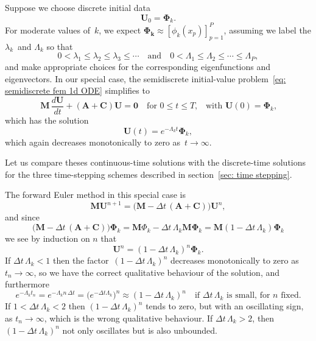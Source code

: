 Suppose we choose discrete initial data
\[
\boldsymbol{U}_0=\boldsymbol{\Phi}_k.
\]
For moderate values of~$k$, we expect 
$\boldsymbol{\Phi_k}\approx[\phi_k(x_p)]_{p=1}^P$, assuming we label the 
$\lambda_k$~and $\Lambda_k$ so that
\[
0<\lambda_1\le\lambda_2\le\lambda_3\le\cdots
\quad\text{and}\quad
0<\Lambda_1\le\Lambda_2\le\cdots\le\Lambda_P,
\]
and make appropriate choices for the corresponding eigenfunctions and 
eigenvectors. In our special case, the semidiscrete initial-value 
problem~\eqref{eq: semidiscrete fem 1d ODE} simplifies to
\[
\boldsymbol{M}\,\frac{d\boldsymbol{U}}{dt}
+(\boldsymbol{A}+\boldsymbol{C})\boldsymbol{U}=\boldsymbol{0}
    \quad\text{for $0\le t\le T$,}
    \quad\text{with $\boldsymbol{U}(0)=\boldsymbol{\Phi}_k$,}
\]
which has the solution
\begin{equation}
\boldsymbol{U}(t)=e^{-\Lambda_kt}\boldsymbol{\Phi}_k,
\end{equation}
which again decreases monotonically to zero as~$t\to\infty$.

Let us compare theses continuous-time solutions with the discrete-time 
solutions for the three time-stepping schemes described in 
section~\ref{sec: time stepping}.  

\begin{example}
The forward Euler method in this special case is
\[
\boldsymbol{M}\boldsymbol{U}^{n+1}=\bigl(\boldsymbol{M}
-\Delta t\,(\boldsymbol{A}+\boldsymbol{C})\bigr)\boldsymbol{U}^n,
\]
and since
\[
\bigl(\boldsymbol{M} 
-\Delta t\,(\boldsymbol{A}+\boldsymbol{C})\bigr)\boldsymbol{\Phi}_k
    =\boldsymbol{M}\Phi_k-\Delta t\,\Lambda_k\boldsymbol{M}\boldsymbol{\Phi}_k
    =\boldsymbol{M}(1-\Delta t\,\Lambda_k)\boldsymbol{\Phi}_k
\]
we see by induction on $n$ that
\[
\boldsymbol{U}^n=(1-\Delta t\,\Lambda_k)^n\boldsymbol{\Phi}_k.
\]
If $\Delta t\,\Lambda_k<1$ then the factor~$(1-\Delta t\,\Lambda_k)^n$ 
decreases monotonically to zero as~$t_n\to\infty$, so we have the correct 
qualitative behaviour of the solution, and furthermore
\[
e^{-\Lambda_kt_n}=e^{-\Lambda_k n\,\Delta t}
    =\bigl(e^{-\Delta t\Lambda_k}\bigr)^n\approx(1-\Delta t\,\Lambda_k)^n
    \quad\text{if $\Delta t\,\Lambda_k$ is small, for $n$ fixed.}
\]
If $1<\Delta t\,\Lambda_k<2$ then $(1-\Delta t\,\Lambda_k)^n$ tends to zero, 
but with an oscillating sign, as $t_n\to\infty$, which is the wrong qualitative 
behaviour. If $\Delta t\,\Lambda_k>2$, then $(1-\Delta t\,\Lambda_k)^n$ not 
only oscillates but is also unbounded.
\end{example}

